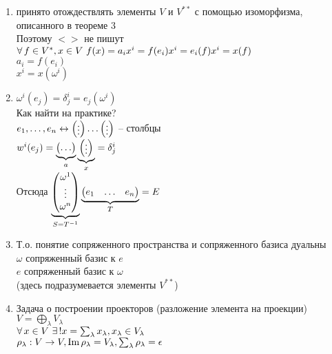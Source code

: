 \documentclass[12pt]{article}
\begin{document}
\begin{enumerate}
    \item принято отождествлять элементы $V$ и $V^{**}$ с помощью изоморфизма, описанного в теореме 3\\
    Поэтому $<>$ не пишут\\
    $\fall f\in V^*, x\in V\ f(x)=a_ix^i = f(e_i)x^i = e_i(f)x^i = x(f)$\\
    $a_i = f(e_i)$\\
    $x^i = x(\omega^i)$
    \item $\omega^i(e_j) = \delta_j^i = e_j(\omega^i)$\\
    Как найти на практике?\\
    $e_1, \ldots, e_n \lrto \begin{pmatrix}\vdots\end{pmatrix}\ldots\begin{pmatrix}\vdots\end{pmatrix}$ -- столбцы\\
    $w^i(e_j)=\ub a{\begin{pmatrix}\ldots\end{pmatrix}}\ub x{\begin{pmatrix}\vdots\end{pmatrix}} = \delta_j^i$\\
    Отсюда $\ub{S=T^{-1}}{\begin{pmatrix}
        \omega^1\\\vdots\\\omega^n
    \end{pmatrix}}\ub{T}{\begin{pmatrix}e_1 & \ldots & e_n\end{pmatrix}} = E$
    \item Т.о. понятие сопряженного пространства и сопряженного базиса дуальны\\
    $\omega$ сопряженный базис к $e$\\
    $e$ сопряженный базис к $\omega$\\
    (здесь подразумевается элементы $V^{**}$)
    \item Задача о построении проекторов (разложение элемента на проекции)\\
    $V = \bigoplus_\lambda V_\lambda$\\
    $\fall x \in V\ \ex! x = \sum_\lambda x_\lambda, x_\lambda \in V_\lambda$\\
    $\rho_\lambda: V\rto V, \im \rho_\lambda = V_\lambda, \sum_\lambda \rho_\lambda = \epsilon$\\

\end{enumerate}
\end{document}
